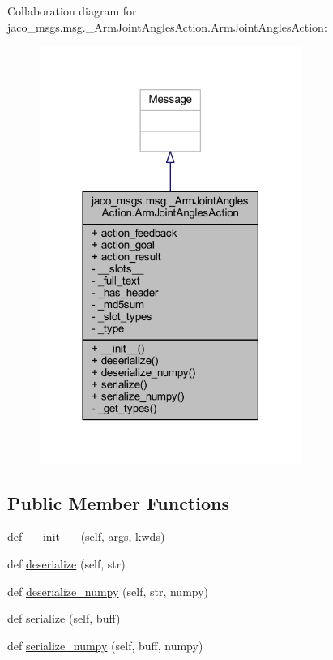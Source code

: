 Collaboration diagram for jaco\+\_\+msgs.\+msg.\+\_\+\+Arm\+Joint\+Angles\+Action.\+Arm\+Joint\+Angles\+Action\+:
\nopagebreak
\begin{figure}[H]
\begin{center}
\leavevmode
\includegraphics[width=242pt]{de/d72/classjaco__msgs_1_1msg_1_1__ArmJointAnglesAction_1_1ArmJointAnglesAction__coll__graph}
\end{center}
\end{figure}
\subsection*{Public Member Functions}
\begin{DoxyCompactItemize}
\item 
def \hyperlink{classjaco__msgs_1_1msg_1_1__ArmJointAnglesAction_1_1ArmJointAnglesAction_a8439ec228e0e1910a6a0349a3296903b}{\+\_\+\+\_\+init\+\_\+\+\_\+} (self, args, kwds)
\item 
def \hyperlink{classjaco__msgs_1_1msg_1_1__ArmJointAnglesAction_1_1ArmJointAnglesAction_acf40100262ea6a8e64214e79e711c9dd}{deserialize} (self, str)
\item 
def \hyperlink{classjaco__msgs_1_1msg_1_1__ArmJointAnglesAction_1_1ArmJointAnglesAction_a08749897ec2a811bc7bb253c107e25d5}{deserialize\+\_\+numpy} (self, str, numpy)
\item 
def \hyperlink{classjaco__msgs_1_1msg_1_1__ArmJointAnglesAction_1_1ArmJointAnglesAction_a037ec8c60926016d9d4b3cdaeac113c3}{serialize} (self, buff)
\item 
def \hyperlink{classjaco__msgs_1_1msg_1_1__ArmJointAnglesAction_1_1ArmJointAnglesAction_a2fe71a4e99d4ac3d0c43569e043f462e}{serialize\+\_\+numpy} (self, buff, numpy)
\end{DoxyCompactItemize}
